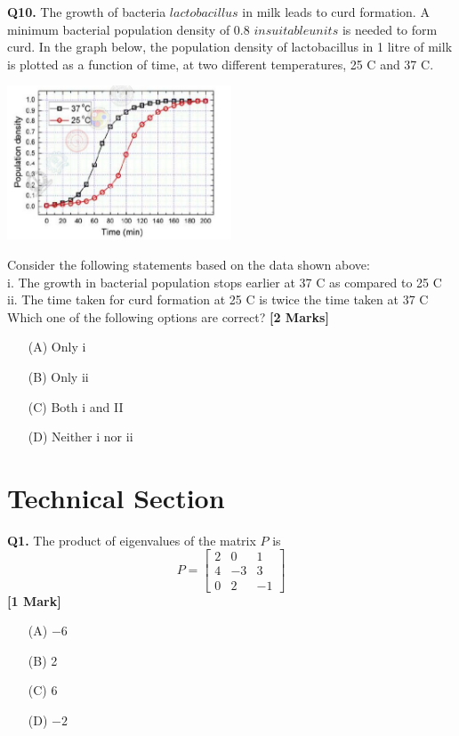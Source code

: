 \documentclass[11pt]{article}
\newcommand{\questiona}[2]{
    \noindent\textbf{Q#2.} #1 \hfill \textbf{[1 Mark]}
}
\newcommand{\questionb}[2]{
    \noindent\textbf{Q#2.} #1 \hfill \textbf{[2 Marks]}
}
\begin{document}
\questionb{The growth of bacteria \(lactobacillus\) in milk leads to curd formation. A minimum bacterial population density of 0.8 \(in suitable units\) is needed to form curd. In the graph below, the population density of lactobacillus in 1 litre of milk is plotted as a function of time, at two different temperatures, 25 C and 37 C.
\begin{center}
\includegraphics[width=0.5\textwidth]{figures/10.png}
\end{center}
Consider the following statements based on the data shown above: \\
i. The growth in bacterial population stops earlier at 37 C as compared to 25 C \\
ii. The time taken for curd formation at 25 C is twice the time taken at 37 C \\
Which one of the following options are correct?
}{10}
\begin{enumerate}
    \item [(A)] Only i
    \item[(B)] Only ii
    \item[(C)] Both i and II
    \item[(D)] Neither i nor ii
\end{enumerate}
\vspace{0.5cm}

\section*{Technical Section}

\questiona{The product of eigenvalues of the matrix \( P \) is  
\[P = \begin{bmatrix} 
2 & 0 & 1 \\ 
4 & -3 & 3 \\ 
0 & 2 & -1 
\end{bmatrix}\]}{1}
\begin{enumerate}
    \item[(A)] \(-6\)  
    \item[(B)] 2  
    \item[(C)] 6  
    \item[(D)] \(-2\)
\end{enumerate}
\vspace{0.5cm}
\end{document}
